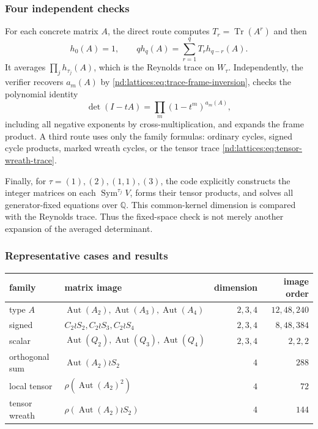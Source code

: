 \documentclass[10pt]{article}
\newcommand{\Sym}{\operatorname{Sym}}
\newcommand{\Tr}{\operatorname{Tr}}
\newcommand{\Aut}{\operatorname{Aut}}
\begin{document}
\subsubsection*{Four independent checks}
For each concrete matrix $A$, the direct route computes
$T_r=\Tr(A^r)$ and then
\begin{equation}\label{nd:lattices:eq:newton-audit}
 h_0(A)=1,\qquad qh_q(A)=\sum_{r=1}^qT_rh_{q-r}(A).
\end{equation}
It averages $\prod_jh_{\tau_j}(A)$, which is the Reynolds trace on
$W_\tau$.  Independently, the verifier recovers $a_m(A)$ by
\eqref{nd:lattices:eq:trace-frame-inversion}, checks the polynomial identity
\[
 \det(I-tA)=\prod_m(1-t^m)^{a_m(A)},
\]
including all negative exponents by cross-multiplication, and expands the
frame product.  A third route uses only the family formulas: ordinary cycles,
signed cycle products, marked wreath cycles, or the tensor trace
\eqref{nd:lattices:eq:tensor-wreath-trace}.

Finally, for $\tau=(1),(2),(1,1),(3)$, the code explicitly constructs the
integer matrices on each $\Sym^{\tau_j}V$, forms their tensor products, and
solves all generator-fixed equations over $\mathbb Q$.  This common-kernel
dimension is compared with the Reynolds trace.  Thus the fixed-space check is
not merely another expansion of the averaged determinant.

\subsubsection*{Representative cases and results}
\begin{center}
\small
\begin{tabular}{@{}llrr@{}}\toprule
family & matrix image & dimension & image order\\\midrule
type $A$ & $\Aut(A_2),\Aut(A_3),\Aut(A_4)$ & $2,3,4$ & $12,48,240$\\
signed & $C_2\wr S_2,C_2\wr S_3,C_2\wr S_4$ & $2,3,4$ & $8,48,384$\\
scalar & $\Aut(Q_2),\Aut(Q_3),\Aut(Q_4)$ & $2,3,4$ & $2,2,2$\\
orthogonal sum & $\Aut(A_2)\wr S_2$ & $4$ & $288$\\
local tensor & $\rho(\Aut(A_2)^2)$ & $4$ & $72$\\
tensor wreath & $\rho(\Aut(A_2)\wr S_2)$ & $4$ & $144$\\\bottomrule
\end{tabular}
\end{center}
\end{document}
